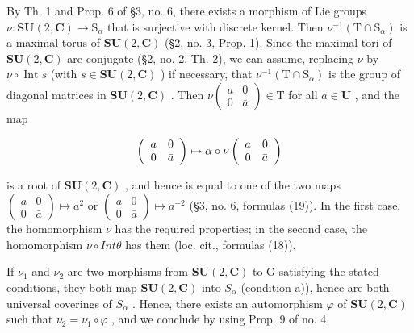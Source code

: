 By Th. 1 and Prop. 6 of §3, no. 6, there exists a morphism of Lie groups \(\nu : \mathbf{SU}(2, \mathbf{C}) \to \mathrm{S}_{\alpha}\) that is surjective with discrete kernel. Then \(\nu^{-1}(\mathrm{T} \cap \mathrm{S}_{\alpha})\) is a maximal torus of \(\mathbf{SU}(2, \mathbf{C})\) (§2, no. 3, Prop. 1). Since the maximal tori of \(\mathbf{SU}(2, \mathbf{C})\) are conjugate (§2, no. 2, Th. 2), we can assume, replacing \(\nu\) by \(\nu \circ \operatorname{Int}s\) (with \(s \in \mathbf{SU}(2, \mathbf{C})\) ) if necessary, that \(\nu^{-1}(\mathrm{T} \cap \mathrm{S}_{\alpha})\) is the group of diagonal matrices in \(\mathbf{SU}(2, \mathbf{C})\) . Then \(\nu\begin{pmatrix} a & 0 \\ 0 & \bar{a} \end{pmatrix} \in \mathrm{T}\) for all \(a \in \mathbf{U}\) , and the map

\[
\left( \begin{array}{c c} a & 0 \\ 0 & \bar {a} \end{array} \right) \mapsto \alpha \circ \nu \left( \begin{array}{c c} a & 0 \\ 0 & \bar {a} \end{array} \right)
\]

is a root of \(\mathbf{SU}(2,\mathbf{C})\) , and hence is equal to one of the two maps \(\begin{pmatrix}a&0\\ 0&\bar{a}\end{pmatrix}\mapsto a^{2}\) or \(\begin{pmatrix}a&0\\ 0&\bar{a}\end{pmatrix}\mapsto a^{-2}\) (§3, no. 6, formulas (19)). In the first case, the homomorphism \(\nu\) has the required properties; in the second case, the homomorphism \(\nu\circ Int\theta\) has them (loc. cit., formulas (18)).

If \(\nu_{1}\) and \(\nu_{2}\) are two morphisms from \(\mathbf{SU}(2,\mathbf{C})\) to G satisfying the stated conditions, they both map \(\mathbf{SU}(2,\mathbf{C})\) into \(S_{\alpha}\) (condition a)), hence are both universal coverings of \(S_{\alpha}\) . Hence, there exists an automorphism \(\varphi\) of \(\mathbf{SU}(2,\mathbf{C})\) such that \(\nu_{2} = \nu_{1} \circ \varphi\) , and we conclude by using Prop. 9 of no. 4.

